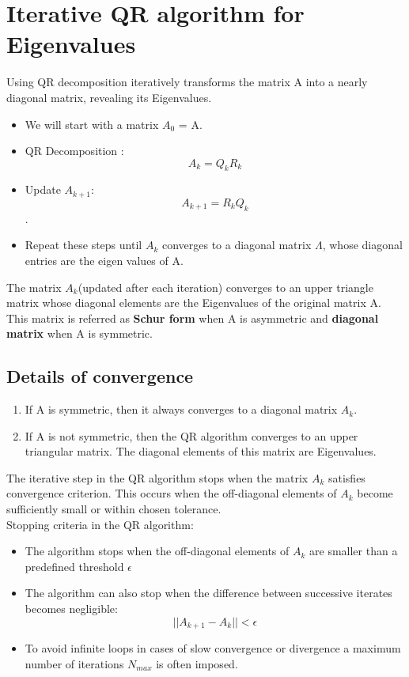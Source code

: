 \documentclass{article}
\begin{document}
\section{Iterative QR algorithm for Eigenvalues}
Using QR decomposition iteratively transforms the matrix A into a nearly diagonal matrix, revealing its Eigenvalues.
\begin{itemize}
    \item We will start with a matrix $A_0$ = A.
    \item QR Decomposition :$$A_k = Q_kR_k$$
    \item Update $A_{k+1}:$ $$A_{k+1} = R_kQ_k$$.
    \item Repeat these steps until $A_k$ converges to a diagonal matrix $\Lambda$, whose diagonal entries are the eigen values of A.
\end{itemize}
The matrix $A_k$(updated after each iteration) converges to an upper triangle matrix whose diagonal elements are the Eigenvalues of the original matrix A. This matrix is referred as \textbf{Schur form} when A is asymmetric and \textbf{diagonal matrix} when A is symmetric.
\subsection{Details of convergence}
\begin{enumerate}
    \item If  A is symmetric, then it always converges to a diagonal matrix $A_k$.
    \item If A is not symmetric, then the QR algorithm converges to an upper triangular matrix. The diagonal elements of this matrix are Eigenvalues.
\end{enumerate}
The iterative step in the QR algorithm stops when the matrix $A_k$ satisfies convergence criterion. This occurs when the off-diagonal elements of $A_k$ become sufficiently small or within chosen tolerance.
\\Stopping criteria in the QR algorithm:
\begin{itemize}
    \item The algorithm stops when the off-diagonal elements of $A_k$ are smaller than a predefined threshold $\epsilon$
    \item The algorithm can also stop when the difference between successive iterates becomes negligible:$$||A_{k+1}-A_k||<\epsilon$$
    \item To avoid infinite loops in cases of slow convergence or divergence a maximum number of iterations $N_{max}$ is often imposed.
\end{itemize}
\end{document}
